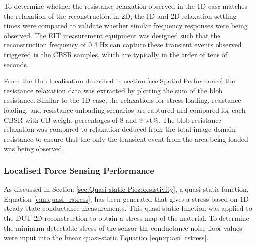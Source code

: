 To determine whether the resistance relaxation observed in the 1D case matches the relaxation of the reconstruction in 2D, the 1D and 2D relaxation settling times were compared to validate whether similar frequency responses were being observed. The EIT measurement equipment was designed such that the reconstruction frequency of 0.4 Hz can capture these transient events observed triggered in the CBSR samples, which are typically in the order of tens of seconds. 


From the blob localisation described in section \ref{sec:Spatial Performance} the resistance relaxation data was extracted by plotting the sum of the blob resistance. Similar to the 1D case, the relaxations for stress loading, resistance loading, and resistance unloading scenarios are captured and compared for each CBSR with CB weight percentages of 8 and 9 wt\%. The blob resistance relaxation was compared to relaxation deduced from the total image domain resistance to ensure that the only the transient event from the area being loaded was being observed.

\subsubsection{Localised Force Sensing Performance}\label{sec:Localised Force Sensing Performance}
As discussed in Section \ref{sec:Quasi-static Piezoresistivity}, a quasi-static function, Equation \ref{eqn:quasi_rstress}, has been generated that gives a stress based on 1D steady-state conductance measurements. This quasi-static function was applied to the DUT 2D reconstruction to obtain a stress map of the material. To determine the minimum detectable stress of the sensor the conductance noise floor values were input into the linear quasi-static Equation \ref{eqn:quasi_rstress}.

